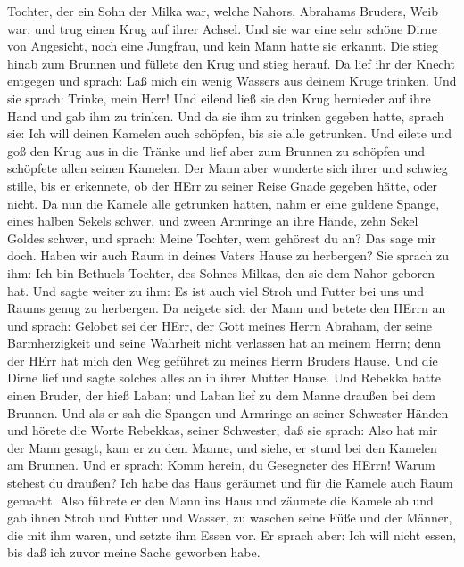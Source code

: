 Tochter, der ein Sohn der Milka war, welche Nahors, Abrahams Bruders,
Weib war, und trug einen Krug auf ihrer Achsel.  Und sie
war eine sehr schöne Dirne von Angesicht, noch eine Jungfrau, und kein
Mann hatte sie erkannt. Die stieg hinab zum Brunnen und füllete den Krug
und stieg herauf.  Da lief ihr der Knecht entgegen und
sprach: Laß mich ein wenig Wassers aus deinem Kruge trinken.
 Und sie sprach: Trinke, mein Herr! Und eilend ließ sie den
Krug hernieder auf ihre Hand und gab ihm zu trinken.  Und
da sie ihm zu trinken gegeben hatte, sprach sie: Ich will deinen Kamelen
auch schöpfen, bis sie alle getrunken.  Und eilete und goß
den Krug aus in die Tränke und lief aber zum Brunnen zu schöpfen und
schöpfete allen seinen Kamelen.  Der Mann aber wunderte
sich ihrer und schwieg stille, bis er erkennete, ob der HErr zu seiner
Reise Gnade gegeben hätte, oder nicht.  Da nun die Kamele
alle getrunken hatten, nahm er eine güldene Spange, eines halben Sekels
schwer, und zween Armringe an ihre Hände, zehn Sekel Goldes schwer,
 und sprach: Meine Tochter, wem gehörest du an? Das sage
mir doch. Haben wir auch Raum in deines Vaters Hause zu herbergen?
 Sie sprach zu ihm: Ich bin Bethuels Tochter, des Sohnes
Milkas, den sie dem Nahor geboren hat.  Und sagte weiter zu
ihm: Es ist auch viel Stroh und Futter bei uns und Raums genug zu
herbergen.  Da neigete sich der Mann und betete den HErrn
an  und sprach: Gelobet sei der HErr, der Gott meines Herrn
Abraham, der seine Barmherzigkeit und seine Wahrheit nicht verlassen hat
an meinem Herrn; denn der HErr hat mich den Weg geführet zu meines Herrn
Bruders Hause.  Und die Dirne lief und sagte solches alles
an in ihrer Mutter Hause.  Und Rebekka hatte einen Bruder,
der hieß Laban; und Laban lief zu dem Manne draußen bei dem Brunnen.
 Und als er sah die Spangen und Armringe an seiner
Schwester Händen und hörete die Worte Rebekkas, seiner Schwester, daß
sie sprach: Also hat mir der Mann gesagt, kam er zu dem Manne, und
siehe, er stund bei den Kamelen am Brunnen.  Und er sprach:
Komm herein, du Gesegneter des HErrn! Warum stehest du draußen? Ich habe
das Haus geräumet und für die Kamele auch Raum gemacht. 
Also führete er den Mann ins Haus und zäumete die Kamele ab und gab
ihnen Stroh und Futter und Wasser, zu waschen seine Füße und der Männer,
die mit ihm waren,  und setzte ihm Essen vor. Er sprach
aber: Ich will nicht essen, bis daß ich zuvor meine Sache geworben habe.

